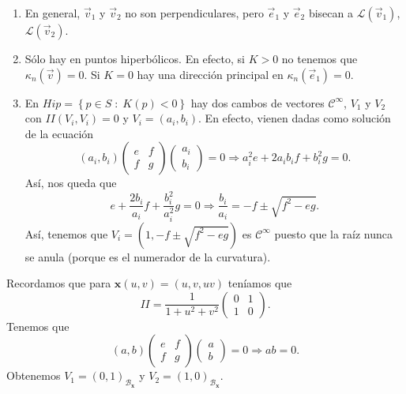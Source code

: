 \begin{observation}
\begin{enumerate}
\item En general, $\displaystyle \vec{v}_{1} $ y $\displaystyle \vec{v}_{2} $ no son perpendiculares, pero $\displaystyle \vec{e}_{1} $ y $\displaystyle \vec{e}_{2} $ bisecan a $\displaystyle \mathcal{L}\left(\vec{v}_{1}\right) $, $\displaystyle \mathcal{L}\left(\vec{v}_{2}\right) $. 
\item Sólo hay en puntos hiperbólicos. En efecto, si $\displaystyle K > 0 $ no tenemos que $\displaystyle \kappa_{n}\left(\vec{v}\right)=0 $. Si $\displaystyle K = 0 $ hay una dirección principal en $\displaystyle \kappa_{n}\left(\vec{e}_{1}\right)=0 $. 
\item En $\displaystyle Hip = \left\{ p \in S \; : \; K\left(p\right)< 0\right\}  $ hay dos cambos de vectores $\displaystyle \mathcal{C}^{\infty } $, $\displaystyle V_{1} $ y $\displaystyle V_{2} $ con $\displaystyle II\left(V_{i}, V_{i}\right)=0 $ y $\displaystyle V_{i}=\left(a_{i}, b_{i}\right) $. En efecto, vienen dadas como solución de la ecuación
	\[\left(a_{i}, b_{i}\right)\begin{pmatrix} e & f \\ f & g \end{pmatrix}\begin{pmatrix}  a_{i} \\ b_{i} \end{pmatrix}=0 \Rightarrow  a_{i}^{2}e + 2a_{i}b_{i} f + b_{i}^{2}g = 0.\]
	Así, nos queda que 
	\[e + \frac{2b_{i}}{a_{i}}f + \frac{b_{i}^{2}}{a_{i}^{2}}g = 0 \Rightarrow \frac{b_{i}}{a_{i}}=-f \pm \sqrt{f^{2}-eg} .\]
Así, tenemos que $\displaystyle V_{i}=\left(1, -f \pm \sqrt{f^{2}-eg}\right) $ es $\displaystyle \mathcal{C}^{\infty } $ puesto que la raíz nunca se anula (porque es el numerador de la curvatura).
\end{enumerate}
\end{observation}
\begin{eg}
	Recordamos que para $\displaystyle \textbf{x} \left(u,v\right)=\left(u,v,uv\right) $ teníamos que 
	\[ II = \frac{1}{1 + u^{2}+v^{2}}\begin{pmatrix} 0 & 1 \\ 1 & 0 \end{pmatrix} .\]
	Tenemos que 
	\[\left(a,b\right)\begin{pmatrix} e & f \\ f & g \end{pmatrix}\begin{pmatrix}  a \\ b \end{pmatrix} = 0 \Rightarrow ab = 0 .\]
Obtenemos $\displaystyle V_{1} = \left(0,1\right)_{\mathcal{B}_{ \textbf{x} }} $ y $\displaystyle V_{2}=\left(1,0\right)_{\mathcal{B}_{ \textbf{x} }} $. 
\end{eg}
